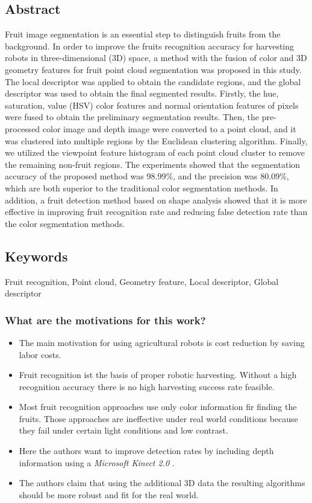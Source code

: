     \subsection*{Abstract}
    Fruit image segmentation is an essential step to distinguish fruits from the background. In order to improve the
    fruits recognition accuracy for harvesting robots in three-dimensional (3D) space, a method with the fusion of
    color and 3D geometry features for fruit point cloud segmentation was proposed in this study. The local descriptor was applied to obtain the candidate regions, and the global descriptor was used to obtain the final
    segmented results. Firstly, the hue, saturation, value (HSV) color features and normal orientation features of
    pixels were fused to obtain the preliminary segmentation results. Then, the pre-processed color image and depth
    image were converted to a point cloud, and it was clustered into multiple regions by the Euclidean clustering
    algorithm. Finally, we utilized the viewpoint feature histogram of each point cloud cluster to remove the
    remaining non-fruit regions. The experiments showed that the segmentation accuracy of the proposed method
    was 98.99\%, and the precision was 80.09\%, which are both superior to the traditional color segmentation
    methods. In addition, a fruit detection method based on shape analysis showed that it is more effective in
    improving fruit recognition rate and reducing false detection rate than the color segmentation methods.
    
    \subsection*{Keywords}
    Fruit recognition, Point cloud, Geometry feature, Local descriptor, Global descriptor
    
     
    \subsubsection*{What are the motivations for this work?}
    \begin{itemize}
        \item The main motivation for using agricultural robots is cost reduction by saving labor costs.
        \item Fruit recognition ist the basis of proper robotic harvesting. Without a high recognition accuracy there is no high harvesting success rate feasible.
        \item Most fruit recognition approaches use only color information fir finding the fruits. Those approaches are ineffective under real world conditions because they fail under certain light conditions and low contrast. 
        \item Here the authors want to improve detection rates by including depth information using a \emph{Microsoft Kinect 2.0} .
        \item The authors claim that using the additional 3D data the resulting algorithms should be more robust and fit for the real world.
    \end{itemize}
